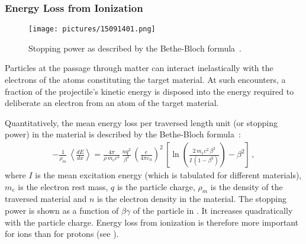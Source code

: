 

\subsubsection{Energy Loss from Ionization} 

  \begin{figure}[t]
  \centering
  \texttt{[image: pictures/15091401.png]}
  \caption{Stopping power as described by the Bethe-Bloch formula~\cite{Beringer:1900zz}. }  
  \label{pic:15091401}
  \end{figure}

Particles at the passage through matter can interact inelastically with the electrons of the atoms constituting the target material. At such encounters, a fraction of the projectile's kinetic energy is disposed into the energy required to deliberate an electron from an atom of the target material.

\newpage
Quantitatively, the mean energy loss per traversed length unit (or stopping power) in the material is described by the Bethe-Bloch formula~\cite{Beringer:1900zz}:
\begin{align}
- \frac{1}{\rho_m} \, \left\langle\frac{dE}{dx}\right\rangle = \frac{4 \pi}{\rho \, m_e c^2} \, \frac{nq^2}{\beta^2} \, \left(\frac{e}{4\pi\varepsilon_0}\right)^2 \, \left[\ln \left(\frac{2 \, m_e c^2 \, \beta^2}{I \, (1-\beta^2)}\right) - \beta^2\right] \, , \label{eq:bethe}
\end{align}
where $I$ is the mean excitation energy (which is tabulated for different materials), $m_e$ is the electron rest mass, $q$ is the particle charge, $\rho_m$ is the density of the traversed material and $n$ is the electron density in the material. The stopping power is shown as a function of $\beta \gamma$ of the particle in . It increases quadratically with the particle charge. Energy loss from ionization is therefore more important for \lead ions than for protons (see ).

